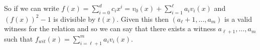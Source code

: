 So if we can write $f(x) = \sum_{i=0}^d c_i x^i = v_0(x) + \sum_{i=1}^\ell a_i v_i(x)$ and $(f(x))^2 - 1$ is divisible by $t(x)$. Given this then $(a_\ell+1, \dots, a_m)$ is a valid witness for the relation and so we can say that there exists a witness $a_{\ell+1}, \dots, a_m$ such that $f_{wit}(x) = \sum_{i=\ell+1}^m a_i v_i(x)$.
